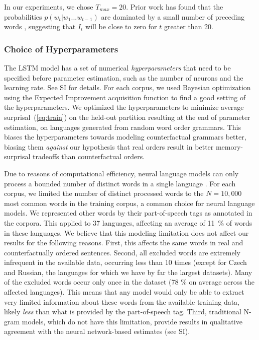 \documentclass[11pt,letterpaper]{article}
\begin{document}
In our experiments, we chose $T_{max} = 20$. Prior work has found that the probabilities $p(w_t|w_1...w_{t-1})$ are dominated by a small number of preceding words \citep{daniluk2017frustratingly}, suggesting that $I_t$ will be close to zero for $t$ greater than 20.



\subsubsection{Choice of Hyperparameters}

The LSTM model has a set of numerical \emph{hyperparameters} that need to be specified before parameter estimation, such as the number of neurons and the learning rate.
See SI for details.
For each corpus, we used Bayesian optimization using the Expected Improvement acquisition function \citep{snoek-practical-2012} to find a good setting of the hyperparameters.
We optimized the hyperparameters to minimize average surprisal~(\ref{eq:train}) on the held-out partition resulting at the end of parameter estimation, on languages generated from random word order grammars.
This biases the hyperparameters towards modeling counterfactual grammars better, biasing them \emph{against} our hypothesis that real orders result in better memory-surprisal tradeoffs than counterfactual orders.

Due to reasons of computational efficiency, neural language models can only process a bounded number of distinct words in a single language \citep{Mikolov2010RecurrentNN}.
For each corpus, we limited the number of distinct processed words to the $N=10,000$ most common words in the training corpus, a common choice for neural language models.
We represented other words by their part-of-speech tags as annotated in the corpora.
This applied to 37 languages, affecting an average of 11~\% of words in these languages.
We believe that this modeling limitation does not affect our results for the following reasons.
First, this affects the same words in real and counterfactually ordered sentences.
Second, all excluded words are extremely infrequent in the available data, occurring less than 10 times (except for Czech and Russian, the languages for which we have by far the largest datasets).
Many of the excluded words occur only once in the dataset (78 \% on average across the affected languages).
This means that any model would only be able to extract very limited information about these words from the available training data, likely \emph{less} than what is provided by the part-of-speech tag.
Third, traditional N-gram models, which do not have this limitation, provide results in qualitative agreement with the neural network-based estimates (see SI).
\end{document}

